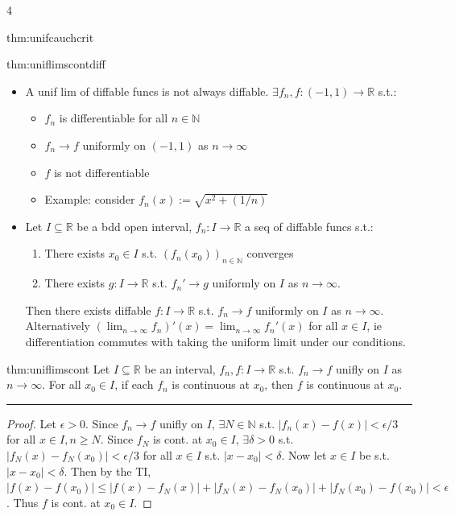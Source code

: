 \documentclass[landscape, 8pt]{extarticle}
\begin{document}
\begin{multicols*}{4}
\begin{mthm}{thm:unifcauchcrit}{ }
		\end{mthm}
		
		
		\begin{thm-s}{thm:uniflimscontdiff}{ }
		\begin{itemize}
			\item A unif lim of diffable funcs is not always diffable. $\exists f_n, f : (-1, 1) \to \mathbb{R}$ s.t.:
			\begin{itemize}
				\item $f_n$ is differentiable for all $n\in \mathbb{N}$
				\item $f_n \to f$ uniformly on $(-1, 1)$ as $n \to \infty$
				\item $f$ is not differentiable
				\item Example: consider $f_n(x) := \sqrt{x^2 + (1/n)}$
			\end{itemize}
			\item Let $I \subseteq \mathbb{R}$ be a bdd open interval, $f_n : I \to \mathbb{R}$ a seq of diffable funcs s.t.:
			\begin{enumerate}[label=(\arabic*)]
				\item There exists $x_0\in I$ s.t. $(f_n(x_0))_{n\in \mathbb{N}}$ converges
				\item There exists $g: I \to \mathbb{R}$ s.t. $f_n' \to g$ uniformly on $I$ as $n \to \infty$.
			\end{enumerate}
			Then there exists diffable $f: I \to \mathbb{R}$ s.t. $f_n \to f$ uniformly on $I$ as $n \to \infty$. Alternatively $(\lim_{n\to \infty}f_n)'(x) = \lim_{n\to \infty}f_n'(x)$ for all $x\in I$, ie differentiation commutes with taking the uniform limit under our conditions.
		\end{itemize}
		
		\end{thm-s}
		
		
		\begin{thm}{thm:uniflimscont}{ }
		Let $I \subseteq\mathbb{R}$ be an interval, $f_n, f : I \to \mathbb{R}$ s.t. $f_n \to f$ unifly on $I$ as $n \to \infty$. For all $x_0\in I$, if each $f_n$ is continuous at $x_0$, then $f$ is continuous at $x_0$.
		\vspace{1pt}
		\hrule	
		\vspace{-6pt}
		\begin{proof}
			Let $\epsilon > 0$. Since $f_n \to f$ unifly on $I$, $\exists N\in \mathbb{N}$ s.t. $\left|f_n(x) - f(x)\right| <\epsilon/3$ for all $x\in I, n \ge N$. Since $f_N$ is cont. at $x_0\in I$, $\exists \delta >0$ s.t. $\left|f_N(x) - f_N(x_0)\right| <\epsilon/3$ for all $x\in I$ s.t. $\left|x-x_0\right| < \delta$. Now let $x\in I$ be s.t. $\left|x - x_0\right| < \delta$. Then by the TI, $\left|f(x) - f(x_0)\right| \le \left|f(x) - f_N(x)\right| + \left|f_N(x) - f_N(x_0)\right| + \left|f_N(x_0) -f(x_0)\right| <\epsilon$. Thus $f$ is cont. at $x_0\in I$.
		\end{proof}
		

\end{thm}
\end{multicols*}
\end{document}
